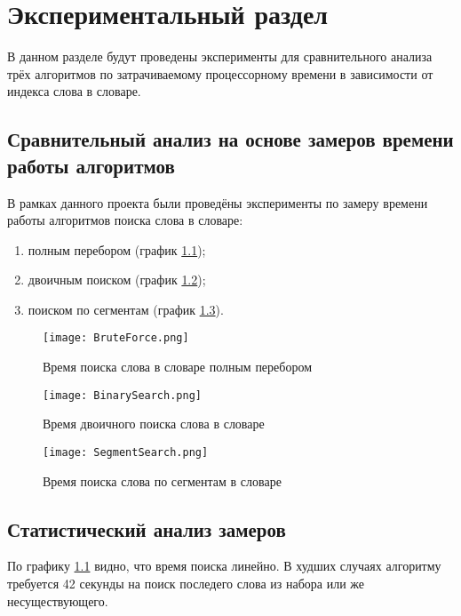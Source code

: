 	\chapter{Экспериментальный раздел}
\label{cha:research}
    В данном разделе будут проведены эксперименты 
    для сравнительного анализа трёх алгоритмов по затрачиваемому процессорному 
    времени в зависимости от индекса слова в словаре.

    \section{Сравнительный анализ на основе замеров времени работы алгоритмов}
        В рамках данного проекта были проведёны эксперименты
        по замеру времени работы алгоритмов поиска слова в словаре:
        \begin{enumerate}
            \item полным перебором (график \ref{graph:test:brute-force});
            \item двоичным поиском (график \ref{graph:test:binary});
            \item поиском по сегментам (график \ref{graph:test:segment}).
        \end{enumerate}

        \begin{figure}[h!]
            \centering
                \texttt{[image: BruteForce.png]}
                \caption{Время поиска слова в словаре полным перебором}
                \label{graph:test:brute-force}
        \end{figure}


        
        \begin{figure}[h!]
            \centering
                \texttt{[image: BinarySearch.png]}
                \caption{Время двоичного поиска слова в словаре}
                \label{graph:test:binary}
        \end{figure}

        \begin{figure}[h!]
            \centering
                \texttt{[image: SegmentSearch.png]}
                \caption{Время поиска слова по сегментам в словаре}
                \label{graph:test:segment}
        \end{figure}

    \section{Статистический анализ замеров}
        По графику \ref{graph:test:brute-force} видно, 
        что время поиска линейно.
        В худших случаях алгоритму требуется 42 секунды 
        на поиск последего слова из набора или же несуществующего. 

